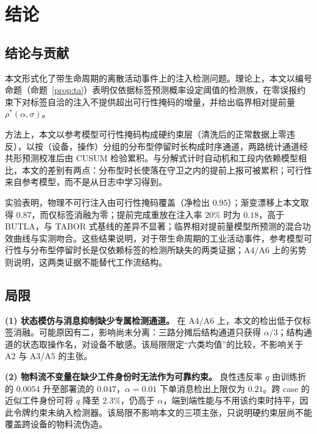\documentclass[manuscript,screen,review]{acmart}
\begin{document}
\section{结论}
\label{sec:conclusion}

\subsection{结论与贡献}
\label{sec:contributions}

本文形式化了带生命周期的离散活动事件上的注入检测问题。理论上，本文以编号命题（命题~\ref{prop:ta}）表明仅依据标签预测概率设定阈值的检测族，在零误报约束下对标签自洽的注入不提供超出可行性掩码的增量，并给出临界相对提前量 $\rho^*(\alpha,\sigma)$。

方法上，本文以参考模型可行性掩码构成硬约束层（清洗后的正常数据上零违反），以按（设备，操作）分组的分布型停留时长构成时序通道，两路统计通道经共形预测校准后由 {CUSUM} 检验累积。与分解式计时自动机和工段内依赖模型相比，本文的差别有两点：分布型时长使落在守卫之内的提前上报可被累积；可行性来自参考模型，而不是从日志中学习得到。

实验表明，物理不可行注入由可行性掩码覆盖（净检出 $0.95$）；渐变漂移上本文取得 $0.87$，而仅标签消融为零；提前完成重放在注入率 $20\%$ 时为 $0.18$，高于 {BUTLA}，与 {TABOR} 式基线的差异不显著；临界相对提前量模型所预测的混合功效曲线与实测吻合。这些结果说明，对于带生命周期的工业活动事件，参考模型可行性与分布型停留时长是仅依赖标签的检测所缺失的两类证据；{A4}/{A6} 上的劣势则说明，这两类证据不能替代工作流结构。

\subsection{局限}
\label{sec:limitations}

\textbf{(1) 状态模仿与消息抑制缺少专属检测通道。}
在 {A4}/{A6} 上，本文的检出低于仅标签消融。可能原因有二，影响尚未分离：三路分摊后结构通道只获得 $\alpha/3$；结构通道的状态取操作名，对设备不敏感。该局限限定``六类均值''的比较，不影响关于 {A2} 与 {A3}/{A5} 的主张。

\textbf{(2) 物料流不变量在缺少工件身份时无法作为可靠约束。}
良性违反率 $q$ 由训练折的 $0.0054$ 升至部署流的 $0.047$，$\alpha=0.01$ 下单消息检出上限仅为 $0.21$。跨 case 的近似工件身份可将 $q$ 降至 $2.3\%$，仍高于 $\alpha$，端到端性能与不用该约束时持平，因此令牌约束未纳入检测器。该局限不影响本文的三项主张，只说明硬约束层尚不能覆盖跨设备的物料流伪造。
\end{document}
